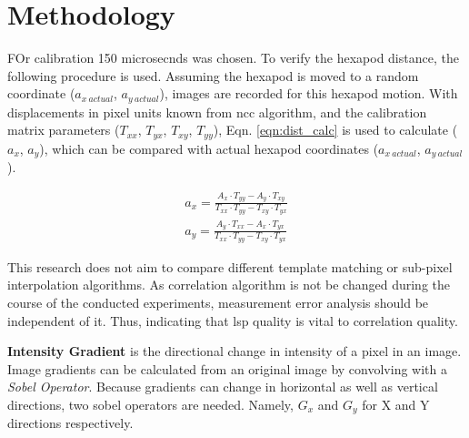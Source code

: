 \chapter{Methodology}\label{chapter:methodology}    
    \vspace{5mm}
    \noindent FOr calibration 150 microsecnds was chosen. To verify the hexapod distance, the following procedure is used. Assuming the hexapod is moved to a random coordinate ($a_{x\ actual}$, $a_{y\ actual}$), images are recorded for this hexapod motion. With displacements in pixel units known from \gls{ncc} algorithm, and the calibration matrix parameters ($T_{xx}$, $T_{yx}$, $T_{xy}$, $T_{yy}$), Eqn. \ref{eqn:dist_calc} is used to calculate ($a_x$, $a_y$), which can be compared with actual hexapod coordinates ($a_{x\ actual}$, $a_{y\ actual}$). 

    \begin{equation}\label{eqn:dist_calc}
        \begin{aligned}
            a_x = \frac{A_x \cdot T_{yy} - A_y \cdot T_{xy}}{T_{xx} \cdot T_{yy} - T_{xy} \cdot T_{yx}} \\
            a_y = \frac{A_y \cdot T_{xx} - A_x \cdot T_{yx}}{T_{xx} \cdot T_{yy} - T_{xy} \cdot T_{yx}}
        \end{aligned}
    \end{equation}

    \vspace{5mm}
    This research does not aim to compare different template matching or sub-pixel interpolation algorithms. As correlation algorithm is not be changed during the course of the conducted experiments, measurement error analysis should be independent of it. Thus, indicating that \gls{lsp} quality is vital to correlation quality.
    
    
    \textbf{Intensity Gradient} is the directional change in intensity of a pixel in an image. Image gradients can be calculated from an original image by convolving with a \emph{Sobel Operator}. Because gradients can change in horizontal as well as vertical directions, two sobel operators are needed. Namely, $G_x$ and $G_y$ for X and Y directions respectively.

